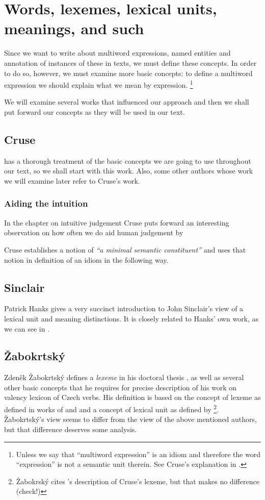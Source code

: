 
\chapter{Words, lexemes, lexical units, meanings, and such}
Since we want to write about multiword expressions, named entities and annotation of instances of these in texts, we must define these concepts. In order to do so, however, we must examine more basic concepts: to define a multiword expression we should explain what we mean by expression. %
\footnote{Unless we say that ``multiword expression'' is an idiom and therefore the word ``expression'' is not a semantic unit therein. See Cruse's explanation in .
} %

We will examine several works that influenced our approach and then we shall put forward our concepts as they will be used in our text.

\section{Cruse}
\label{rel:cruse}
\citetext{D. A. Cruse in his book \emph{Lexical Semantics}, \citeyear{cruse:1986}} has a thorough treatment of the basic concepts we are going to use throughout our text, so we shall start with this work. Also, some other authors whose work we will examine later refer to Cruse's work. 

\subsection{Aiding the intuition}
In the chapter on intuitive judgement Cruse puts forward an interesting observation on how often we do aid human judgement by 


Cruse establishes a notion of \emph{``a minimal semantic constituent''} and uses that notion in definition of an idiom in the following way.


\section{Sinclair}
Patrick Hanks gives a very succinct introduction to John Sinclair's \citep{sinclair:wiki} view of a lexical unit and meaning distinctions. It is closely related to Hanks' own work, as we can see in \citet{hanks:norms}.

\section{Žabokrtský}
Zdeněk Žabokrtský defines a \emph{lexeme} in his doctoral thesis \citep{zabokrtsky:2005a}, as well as several other basic concepts that he requires for precise description of his work on valency lexicon of Czech verbs. His definition is based on the concept of lexeme as defined in works of \citet{cermak:91} and \citet{filipec:1994} and a concept of lexical unit as defined by \citet{cruse:1986}\footnote{Žabokrský cites \citealp{verspoor:1997}'s description of Cruse's lexeme, but that makes no difference {\xxx(check!)}}. Žabokrtský's view seems to differ from the view of the above mentioned authors, but that difference deserves some analysis.


